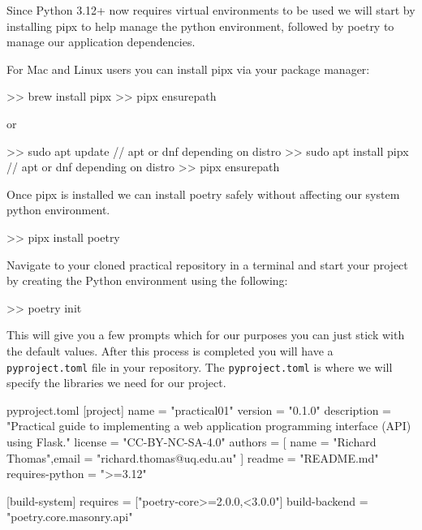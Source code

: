 \documentclass{csse4400}
\begin{document}
Since Python 3.12+ now requires virtual environments to be used we will start by installing pipx to help manage the python environment, followed by poetry to manage our application dependencies.

For Mac and Linux users you can install pipx via your package manager:

\begin{code}[language=bash,numbers=none]{}
  >> brew install pipx
  >> pipx ensurepath
\end{code}

or 

\begin{code}[language=bash,numbers=none]{}
  >> sudo apt update // apt or dnf depending on distro
  >> sudo apt install pipx // apt or dnf depending on distro
  >> pipx ensurepath 
\end{code}

Once pipx is installed we can install poetry safely without affecting our system python environment.

\begin{code}[language=bash,numbers=none]{}
  >> pipx install poetry
\end{code}

Navigate to your cloned practical repository in a terminal and start your project by creating the Python environment using the following:

\begin{code}[language=bash,numbers=none]{}
  >> poetry init
\end{code}

This will give you a few prompts which for our purposes you can just stick with the default values.
After this process is completed you will have a \texttt{pyproject.toml} file in your repository.
The \texttt{pyproject.toml} is where we will specify the libraries we need for our project.

\begin{code}{pyproject.toml}
  [project]
  name = "practical01"
  version = "0.1.0"
  description = "Practical guide to implementing a web application programming interface (API) using Flask."
  license =  "CC-BY-NC-SA-4.0"
  authors = [
      {name = "Richard Thomas",email = "richard.thomas@uq.edu.au"}
  ]
  readme = "README.md"
  requires-python = ">=3.12"


  [build-system]
  requires = ["poetry-core>=2.0.0,<3.0.0"]
  build-backend = "poetry.core.masonry.api"
\end{code}
\end{document}
